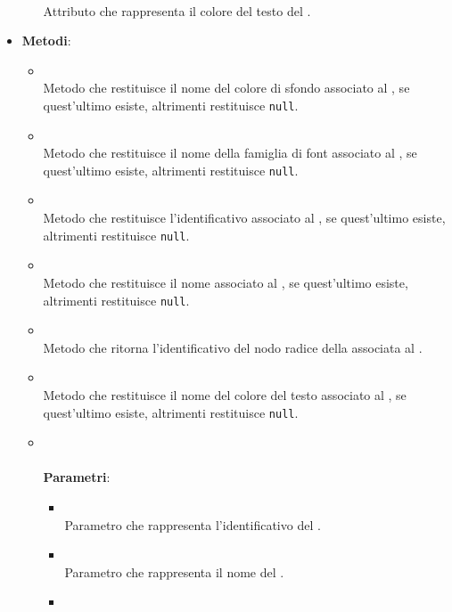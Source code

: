 \begin{itemize}
\begin{itemize}
\\ Attributo che rappresenta il colore del testo del .
\end{itemize}
\item \textbf{Metodi}:
\begin{itemize}
\item {}
\\ Metodo che restituisce il nome del colore di sfondo associato al , se quest'ultimo esiste, altrimenti restituisce \texttt{null}.
\item {}
\\ Metodo che restituisce il nome della famiglia di font associato al , se quest'ultimo esiste, altrimenti restituisce \texttt{null}.
\item {}
\\ Metodo che restituisce l'identificativo associato al , se quest'ultimo esiste, altrimenti restituisce \texttt{null}.
\item {}
\\ Metodo che restituisce il nome associato al , se quest'ultimo esiste, altrimenti restituisce \texttt{null}.
\item {}
\\ Metodo che ritorna l'identificativo del nodo radice della  associata al .
\item {}
\\ Metodo che restituisce il nome del colore del testo associato al , se quest'ultimo esiste, altrimenti restituisce \texttt{null}.
\item {}
\\ \dpConstructor
\\ \textbf{Parametri}:
\begin{itemize}
\item {}
\\ Parametro che rappresenta l'identificativo del .
\item {}
\\ Parametro che rappresenta il nome del .
\item {}

\end{itemize}
\end{itemize}
\end{itemize}
